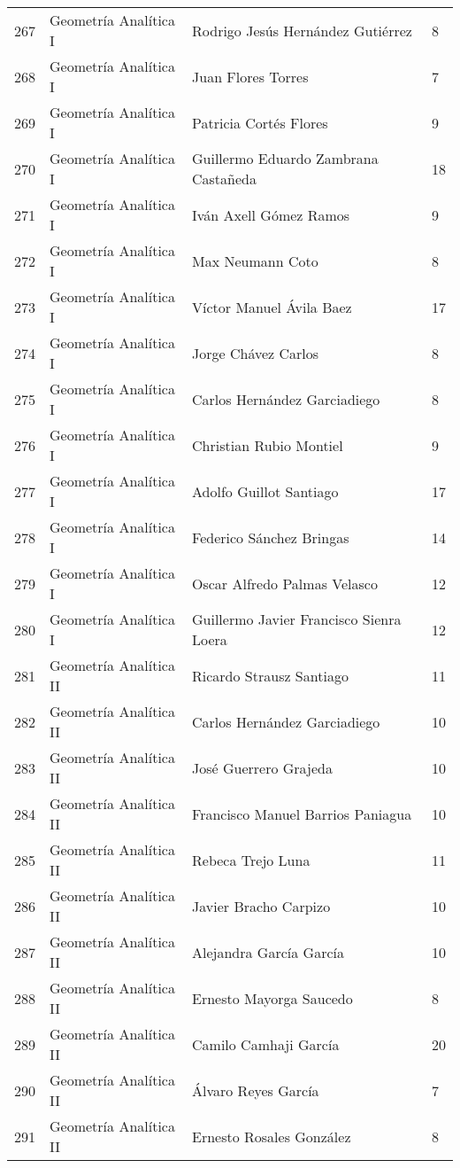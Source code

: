 \begin{table}[ht]
\begin{tabular}{rlll}
  267 & Geometría Analítica I & Rodrigo Jesús Hernández Gutiérrez & 8 \\ 
  268 & Geometría Analítica I & Juan Flores Torres & 7 \\ 
  269 & Geometría Analítica I & Patricia Cortés Flores & 9 \\ 
  270 & Geometría Analítica I & Guillermo Eduardo Zambrana Castañeda & 18 \\ 
  271 & Geometría Analítica I & Iván Axell Gómez Ramos & 9 \\ 
  272 & Geometría Analítica I & Max Neumann Coto & 8 \\ 
  273 & Geometría Analítica I & Víctor Manuel Ávila Baez & 17 \\ 
  274 & Geometría Analítica I & Jorge Chávez Carlos & 8 \\ 
  275 & Geometría Analítica I & Carlos Hernández Garciadiego & 8 \\ 
  276 & Geometría Analítica I & Christian Rubio Montiel & 9 \\ 
  277 & Geometría Analítica I & Adolfo Guillot Santiago & 17 \\ 
  278 & Geometría Analítica I & Federico Sánchez Bringas & 14 \\ 
  279 & Geometría Analítica I & Oscar Alfredo Palmas Velasco & 12 \\ 
  280 & Geometría Analítica I & Guillermo Javier Francisco Sienra Loera & 12 \\ 
  281 & Geometría Analítica II & Ricardo Strausz Santiago & 11 \\ 
  282 & Geometría Analítica II & Carlos Hernández Garciadiego & 10 \\ 
  283 & Geometría Analítica II & José Guerrero Grajeda & 10 \\ 
  284 & Geometría Analítica II & Francisco Manuel Barrios Paniagua & 10 \\ 
  285 & Geometría Analítica II & Rebeca Trejo Luna & 11 \\ 
  286 & Geometría Analítica II & Javier Bracho Carpizo & 10 \\ 
  287 & Geometría Analítica II & Alejandra García García & 10 \\ 
  288 & Geometría Analítica II & Ernesto Mayorga Saucedo & 8 \\ 
  289 & Geometría Analítica II & Camilo Camhaji García & 20 \\ 
  290 & Geometría Analítica II & Álvaro Reyes García & 7 \\ 
  291 & Geometría Analítica II & Ernesto Rosales González & 8 \\ 

\end{tabular}
\end{table}
